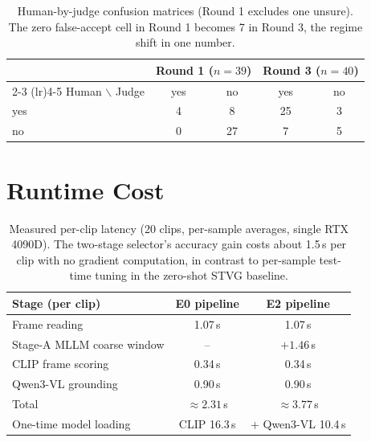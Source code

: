 \begin{table}[htbp]
\centering
\small
\begin{tabular}{lcccc}
\toprule
 & \multicolumn{2}{c}{Round 1 ($n=39$)} & \multicolumn{2}{c}{Round 3 ($n=40$)} \\
\cmidrule(lr){2-3} \cmidrule(lr){4-5}
Human $\backslash$ Judge & yes & no & yes & no \\
\midrule
yes & 4 & 8 & 25 & 3 \\
no & 0 & 27 & 7 & 5 \\
\bottomrule
\end{tabular}
\caption{Human-by-judge confusion matrices (Round 1 excludes one unsure). The zero false-accept cell in Round 1 becomes 7 in Round 3, the regime shift in one number.}
\label{tab:confusion}
\end{table}

\section{Runtime Cost}\label{app:cost}

\begin{table}[htbp]
\centering
\small
\begin{tabular}{lcc}
\toprule
Stage (per clip) & E0 pipeline & E2 pipeline \\
\midrule
Frame reading & 1.07\,s & 1.07\,s \\
Stage-A MLLM coarse window & -- & $+1.46$\,s \\
CLIP frame scoring & 0.34\,s & 0.34\,s \\
Qwen3-VL grounding & 0.90\,s & 0.90\,s \\
Total & $\approx 2.31$\,s & $\approx 3.77$\,s \\
\midrule
One-time model loading & CLIP 16.3\,s & + Qwen3-VL 10.4\,s \\
\bottomrule
\end{tabular}
\caption{Measured per-clip latency (20 clips, per-sample averages, single RTX 4090D). The two-stage selector's accuracy gain costs about 1.5\,s per clip with no gradient computation, in contrast to per-sample test-time tuning in the zero-shot STVG baseline.}
\label{tab:cost}
\end{table}
